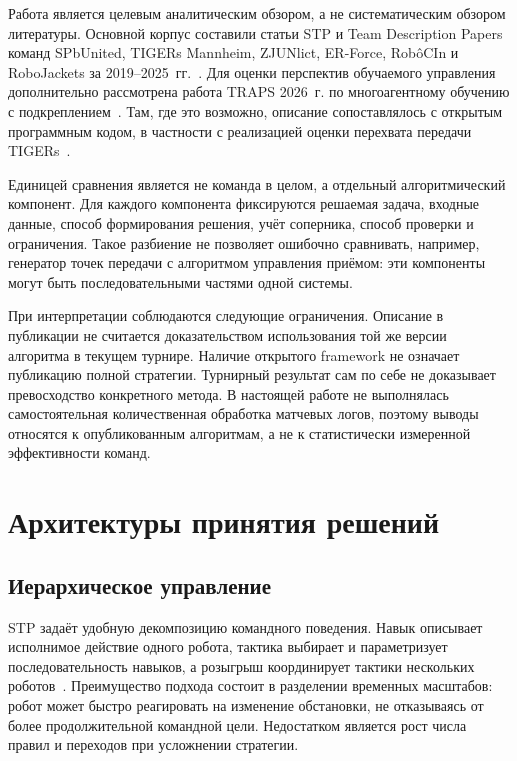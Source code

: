 \documentclass{misisarticle}
\begin{document}
Работа является целевым аналитическим обзором, а не систематическим обзором литературы. Основной корпус составили статьи STP и Team Description Papers команд SPbUnited, TIGERs Mannheim, ZJUNlict, ER-Force, RobôCIn и RoboJackets за 2019--2025~гг.~\cite{spb2025,tigers2025,zjunlict2025,erforce2019,robocin2025,robojackets2024}. Для оценки перспектив обучаемого управления дополнительно рассмотрена работа TRAPS 2026~г. по многоагентному обучению с подкреплением~\cite{traps2026}. Там, где это возможно, описание сопоставлялось с открытым программным кодом, в частности с реализацией оценки перехвата передачи TIGERs~\cite{tigerscode}.

Единицей сравнения является не команда в целом, а отдельный алгоритмический компонент. Для каждого компонента фиксируются решаемая задача, входные данные, способ формирования решения, учёт соперника, способ проверки и ограничения. Такое разбиение не позволяет ошибочно сравнивать, например, генератор точек передачи с алгоритмом управления приёмом: эти компоненты могут быть последовательными частями одной системы.

При интерпретации соблюдаются следующие ограничения. Описание в публикации не считается доказательством использования той же версии алгоритма в текущем турнире. Наличие открытого framework не означает публикацию полной стратегии. Турнирный результат сам по себе не доказывает превосходство конкретного метода. В настоящей работе не выполнялась самостоятельная количественная обработка матчевых логов, поэтому выводы относятся к опубликованным алгоритмам, а не к статистически измеренной эффективности команд.

\section{Архитектуры принятия решений}

\subsection{Иерархическое управление}

STP задаёт удобную декомпозицию командного поведения. Навык описывает исполнимое действие одного робота, тактика выбирает и параметризует последовательность навыков, а розыгрыш координирует тактики нескольких роботов~\cite{stp2005}. Преимущество подхода состоит в разделении временных масштабов: робот может быстро реагировать на изменение обстановки, не отказываясь от более продолжительной командной цели. Недостатком является рост числа правил и переходов при усложнении стратегии.
\end{document}

